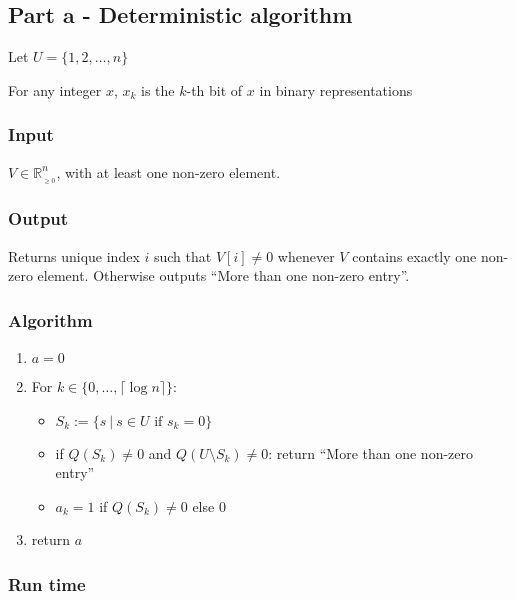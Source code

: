 \subsection*{Part a - Deterministic algorithm}

Let $U = \{1,2,\dots,n\}$

For any integer $x$, $x_k$ is the $k$-th bit of $x$ in binary representations

\subsubsection*{Input}

$V \in \mathbb{R}_{_{\geq 0}}^n$, with at least one non-zero element.

\subsubsection*{Output}

Returns unique index $i$ such that $V[i] \neq 0$ whenever $V$ contains exactly one non-zero element. Otherwise outputs ``More than one non-zero entry''.

\subsubsection*{Algorithm}


\begin{enumerate}
    \item $a = 0$

    \item For $k \in \{0,\dots, \lceil \log n \rceil\}$:

    \begin{itemize}
        \item $S_k := \{s ~ | ~ s \in U \text{ if } s_k = 0 \}$
                
        \item if $Q(S_k) \neq 0$ and $Q(U \setminus S_k) \neq 0$: return ``More than one non-zero entry''
        
        \item $a_k = 1$ if $Q(S_k) \neq 0$ else $0$
        
    \end{itemize}
    
    \item return $a$
\end{enumerate}


\subsubsection*{Run time}

